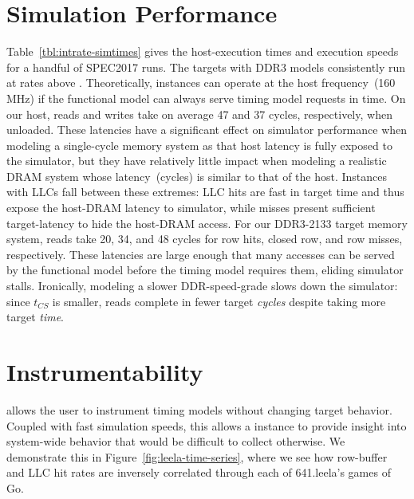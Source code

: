 \vspace{-0.05in}
\section{Simulation Performance}



Table~\ref{tbl:intrate-simtimes} gives the
host-execution times and execution speeds for a handful of SPEC2017 runs. The
targets with DDR3 models consistently run at rates above . Theoretically,
\PNAME instances can operate at the host frequency~(160 MHz) if the functional model can always serve timing model requests in time.
On our host, reads and writes take on average 47
and 37 cycles, respectively, when unloaded.  These latencies have
a significant effect on simulator performance when modeling a single-cycle memory
system as that host latency is fully exposed to the simulator, but
they have relatively little impact
when modeling a realistic DRAM system
whose latency~(cycles) is similar to that of the host.
Instances with LLCs fall between these extremes: LLC hits are fast in
target time and thus expose the host-DRAM latency to simulator, while
misses present sufficient target-latency to hide the host-DRAM access.
For our DDR3-2133 target memory system, reads take 20, 34, and 48 cycles for
row hits, closed row, and row misses, respectively. These latencies are large enough that many accesses can be
served by the functional model before the timing model requires them, eliding simulator stalls.
Ironically, modeling a slower DDR-speed-grade slows down the simulator: since $t_{CS}$ is smaller, reads complete in fewer target
\emph{cycles} despite taking more target \emph{time}.

\vspace{-0.05in}
\section{Instrumentability}
\PNAME allows the user to instrument timing models without changing target
behavior. Coupled with fast simulation speeds, this allows a \PNAME instance to
provide insight into system-wide behavior that would be difficult to collect
otherwise. We demonstrate this in Figure~\ref{fig:leela-time-series}, where we
see how row-buffer and LLC hit rates are inversely correlated through each of
641.leela's games of Go.


